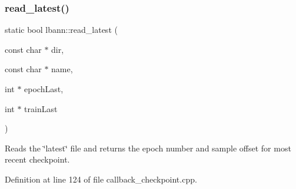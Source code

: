 \subsubsection{\texorpdfstring{read\+\_\+latest()}{read\_latest()}}
{\footnotesize\ttfamily static bool lbann\+::read\+\_\+latest (\begin{DoxyParamCaption}\item[{const char $\ast$}]{dir,  }\item[{const char $\ast$}]{name,  }\item[{int $\ast$}]{epoch\+Last,  }\item[{int $\ast$}]{train\+Last }\end{DoxyParamCaption})\hspace{0.3cm}{\ttfamily [static]}}



Reads the \char`\"{}latest\char`\"{} file and returns the epoch number and sample offset for most recent checkpoint. 



Definition at line 124 of file callback\+\_\+checkpoint.\+cpp.


